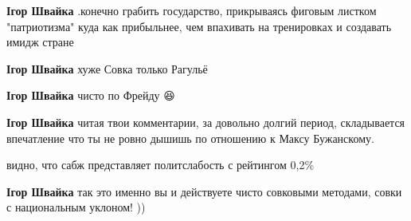 \begin{itemize}
\begin{itemize}
 
\textbf{Ігор Швайка} .конечно грабить государство, прикрываясь фиговым листком
"патриотизма" куда как прибыльнее, чем впахивать на тренировках и создавать
имидж стране

 
\textbf{Ігор Швайка} хуже Совка только Рагульё

 
\textbf{Ігор Швайка} чисто по Фрейду 😆

 
\textbf{Ігор Швайка} читая твои комментарии, за довольно долгий период,
складывается впечатление что ты не ровно дышишь по отношению к Максу
Бужанскому.

 
видно, что сабж представляет политслабость с рейтингом 0,2\%

 
\textbf{Ігор Швайка} так это именно вы и действуете чисто совковыми методами, совки с национальным уклоном! ))


\end{itemize}
\end{itemize}
